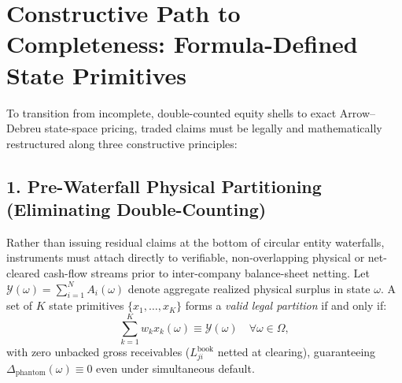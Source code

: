 \documentclass[11pt]{article}
\begin{document}
\section{Constructive Path to Completeness: Formula-Defined State Primitives}

To transition from incomplete, double-counted equity shells to exact Arrow--Debreu state-space pricing, traded claims must be legally and mathematically restructured along three constructive principles:

\subsection{1. Pre-Waterfall Physical Partitioning (Eliminating Double-Counting)}
Rather than issuing residual claims at the bottom of circular entity waterfalls, instruments must attach directly to verifiable, non-overlapping physical or net-cleared cash-flow streams prior to inter-company balance-sheet netting. Let $\mathcal{Y}(\omega) = \sum_{i=1}^N A_i(\omega)$ denote aggregate realized physical surplus in state $\omega$. A set of $K$ state primitives $\{x_1, \dots, x_K\}$ forms a \emph{valid legal partition} if and only if:
\begin{equation}
    \sum_{k=1}^K w_k x_k(\omega) \equiv \mathcal{Y}(\omega) \quad \forall \omega \in \Omega,
\end{equation}
with zero unbacked gross receivables ($L_{ji}^{\mathrm{book}}$ netted at clearing), guaranteeing $\Delta_{\mathrm{phantom}}(\omega) \equiv 0$ even under simultaneous default.
\end{document}
